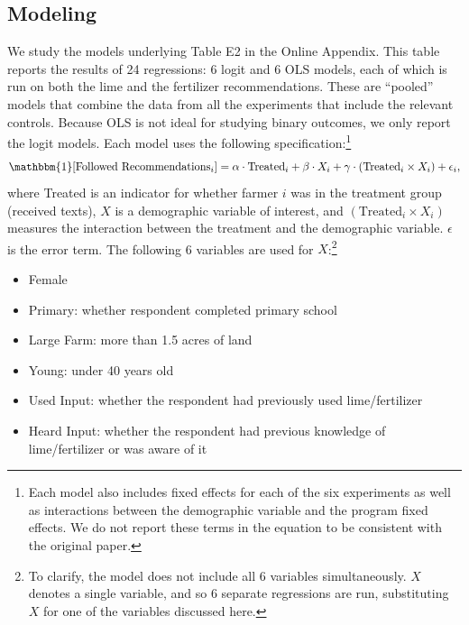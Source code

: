 \documentclass[12pt]{article}
\begin{document}
\subsection{Modeling}
We study the models underlying Table E2 in the \textcite{fabregas_digital_2025} Online Appendix. This table reports the results of 24 regressions: 6 logit and 6 OLS models, each of which is run on both the lime and the fertilizer recommendations. These are ``pooled'' models that combine the data from all the experiments that include the relevant controls. Because OLS is not ideal for studying binary outcomes, we only report the logit models. Each model uses the following specification:\footnote{Each model also includes fixed effects for each of the six experiments as well as interactions between the demographic variable and the program fixed effects. We do not report these terms in the equation to be consistent with the original paper.}
\begin{equation}
    \mathbbm{1}[\text{Followed Recommendations}_i] = \alpha \cdot \text{Treated}_i + \beta \cdot X_i + \gamma \cdot (\text{Treated}_i \times X_i) + \epsilon_i,
\end{equation}
where Treated is an indicator for whether farmer $i$ was in the treatment group (received texts), $X$ is a demographic variable of interest, and $(\text{Treated}_i \times X_i)$ measures the interaction between the treatment and the demographic variable. $\epsilon$ is the error term. The following 6 variables are used for $X$:\footnote{To clarify, the model does not include all 6 variables simultaneously. $X$ denotes a single variable, and so 6 separate regressions are run, substituting $X$ for one of the variables discussed here.}
\begin{itemize}
    \singlespacing
    \item Female
    \item Primary: whether respondent completed primary school
    \item Large Farm: more than 1.5 acres of land
    \item Young: under 40 years old
    \item Used Input: whether the respondent had previously used lime/fertilizer
    \item Heard Input: whether the respondent had previous knowledge of lime/fertilizer or was aware of it
\end{itemize}
\end{document}
